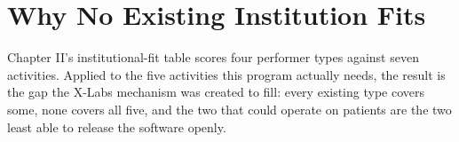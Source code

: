 \section{Why No Existing Institution Fits}

Chapter II's institutional-fit table scores four performer types against seven
activities. Applied to the five activities this program actually needs, the
result is the gap the X-Labs mechanism was created to fill: every existing type
covers some, none covers all five, and the two that could operate on patients
are the two least able to release the software openly.

